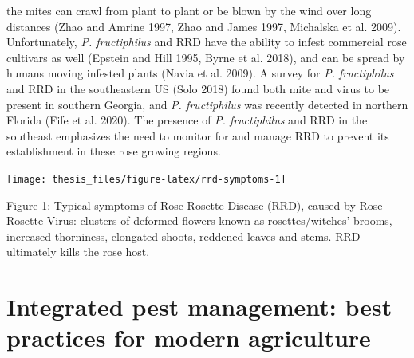 \documentclass[12pt,final,CPage]{ufthesis}
\begin{document}
{the mites can crawl from plant to plant or be blown by the wind over long distances (Zhao and Amrine 1997, Zhao and James 1997, Michalska et al. 2009). Unfortunately, \emph{P. fructiphilus} and RRD have the ability to infest commercial rose cultivars as well (Epstein and Hill 1995, Byrne et al. 2018), and can be spread by humans moving infested plants (Navia et al. 2009). A survey for \emph{P. fructiphilus} and RRD in the southeastern US (Solo 2018) found both mite and virus to be present in southern Georgia, and \emph{P. fructiphilus} was recently detected in northern Florida (Fife et al. 2020). The presence of \emph{P. fructiphilus} and RRD in the southeast emphasizes the need to monitor for and manage RRD to prevent its establishment in these rose growing regions.
  \begin{center}\texttt{[image: thesis\_files/figure-latex/rrd-symptoms-1]} \end{center}

  Figure 1: Typical symptoms of Rose Rosette Disease (RRD), caused by Rose Rosette Virus: clusters of deformed flowers known as rosettes/witches' brooms, increased thorniness, elongated shoots, reddened leaves and stems. RRD ultimately kills the rose host.

  \hypertarget{ipm-litrev}{%
  \section{Integrated pest management: best practices for modern agriculture}\label{ipm-litrev}}

}
\end{document}
